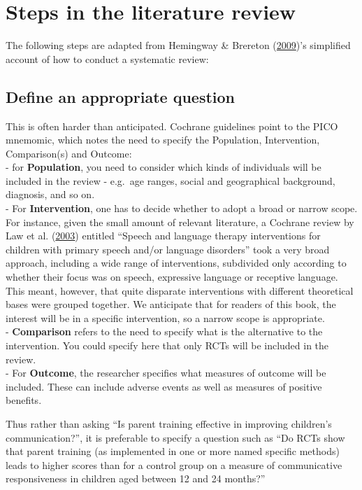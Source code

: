 \documentclass{krantz}
\begin{document}
\hypertarget{steps-in-the-literature-review}{%
\section{Steps in the literature review}\label{steps-in-the-literature-review}}

The following steps are adapted from Hemingway \& Brereton (\protect\hyperlink{ref-hemingway2009}{2009})'s simplified account of how to conduct a systematic review:\\

\hypertarget{define-an-appropriate-question}{%
\subsection{Define an appropriate question}\label{define-an-appropriate-question}}

This is often harder than anticipated. Cochrane guidelines point to the PICO mnemomic, which notes the need to specify the Population, Intervention, Comparison(s) and Outcome:\\
- for \textbf{Population}, you need to consider which kinds of individuals will be included in the review - e.g.~age ranges, social and geographical background, diagnosis, and so on.\\
- For \textbf{Intervention}, one has to decide whether to adopt a broad or narrow scope. For instance, given the small amount of relevant literature, a Cochrane review by Law et al. (\protect\hyperlink{ref-law2003}{2003}) entitled ``Speech and language therapy interventions for children with primary speech and/or language disorders'' took a very broad approach, including a wide range of interventions, subdivided only according to whether their focus was on speech, expressive language or receptive language. This meant, however, that quite disparate interventions with different theoretical bases were grouped together. We anticipate that for readers of this book, the interest will be in a specific intervention, so a narrow scope is appropriate.\\
- \textbf{Comparison} refers to the need to specify what is the alternative to the intervention. You could specify here that only RCTs will be included in the review.\\
- For \textbf{Outcome}, the researcher specifies what measures of outcome will be included. These can include adverse events as well as measures of positive benefits.

Thus rather than asking ``Is parent training effective in improving children's communication?'', it is preferable to specify a question such as ``Do RCTs show that parent training (as implemented in one or more named specific methods) leads to higher scores than for a control group on a measure of communicative responsiveness in children aged between 12 and 24 months?''
\end{document}
